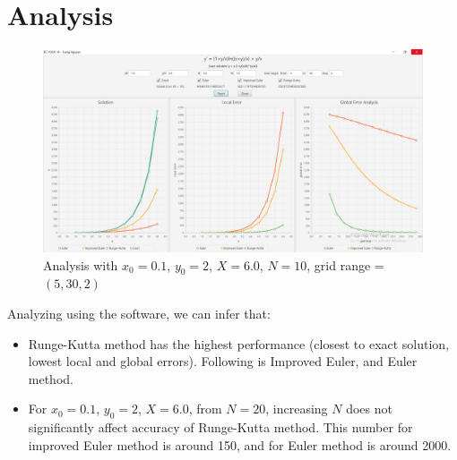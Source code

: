 \section{Analysis}
\label{chapter3}

\begin{figure}[H]
	\centering
	\includegraphics[width=\linewidth]{image/full.png}
	\caption{Analysis with $x_0=0.1$, $y_0=2$, $X=6.0$, $N=10$, grid range = $(5,30,2)$}
	\label{fig:applicationscreenshot}
\end{figure}

Analyzing using the software, we can infer that:
\begin{itemize}  
\item Runge-Kutta method has the highest performance (closest to exact solution, lowest local and global errors). Following is Improved Euler, and Euler method.
\item For $x_0=0.1$, $y_0=2$, $X=6.0$, from $N=20$, increasing $N$ does not significantly affect accuracy of Runge-Kutta method. This number for improved Euler method is around 150, and for Euler method is around 2000.
\end{itemize}